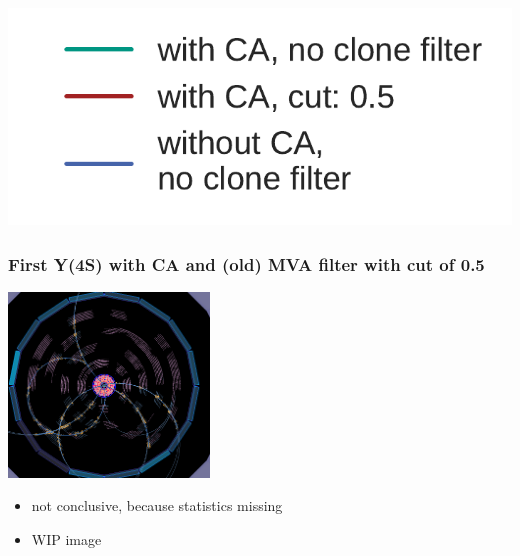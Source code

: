 \documentclass[18pt, aspectratio=169]{beamer}
\begin{document}
\begin{frame}
\begin{columns}
\begin{column}{.5\textwidth}
    \end{column}
  \end{columns}
  \begin{center}
    \includegraphics[width=.2\textwidth]{figures/legend_fom_profile.pdf}
  \end{center}
\end{frame}

\begin{frame}
  \frametitle{First Y(4S) with CA and (old) MVA filter with cut of 0.5}
  \begin{center}
    \includegraphics[width=0.4\textwidth]{figures/first_y4s_ca_cut.png}
  \end{center}
  \begin{itemize}
  \item not conclusive, because statistics missing
  \item WIP image
  \end{itemize}

\end{frame}
\end{document}
